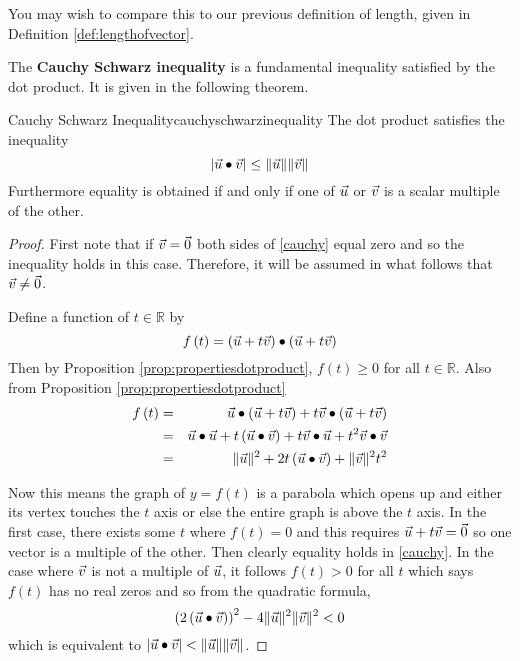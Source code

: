 You may wish to compare this to our previous definition of length, 
given in Definition \ref{def:lengthofvector}. 

The \textbf{Cauchy Schwarz inequality} is a fundamental inequality satisfied by the dot product. 
 It is given in the following theorem.

\begin{theorem}{Cauchy Schwarz Inequality}{cauchyschwarzinequality}
The dot product satisfies the inequality
\begin{equation}
\left\vert \vec{u}\bullet \vec{v}\right\vert \leq \| \vec{u}\| \| \vec{v}\|   \label{cauchy}
\end{equation}
Furthermore equality is obtained if and only if one of $\vec{u}$ or $\vec{v}$ is a scalar multiple of the other.
\end{theorem}

\begin{proof}
First note that if $\vec{v}=\vec{0}$ both sides of \ref{cauchy}
equal zero and so the inequality holds in this case. Therefore, it will be
assumed in what follows that $\vec{v}\neq \vec{0}$.

Define a function of $t\in \mathbb{R}$ by 
\begin{equation*}
f\left( t\right) =\left( \vec{u}+t\vec{v}\right) \bullet \left( \vec{u}+
t\vec{v}\right) 
\end{equation*}
Then by Proposition \ref{prop:propertiesdotproduct}, $f\left( t\right) \geq 0$ for all $t\in \mathbb{R}$.
Also from Proposition \ref{prop:propertiesdotproduct}
\begin{eqnarray*}
f\left( t\right) &=&\vec{u}\bullet \left( \vec{u}+t\vec{v}\right) +
t\vec{v}\bullet \left( \vec{u}+t\vec{v}\right) \\
&=&\vec{u}\bullet \vec{u}+t\left( \vec{u}\bullet \vec{v}\right) + t \vec{v}\bullet \vec{u}+
t^{2}\vec{v}\bullet \vec{v} \\
&=&\| \vec{u}\| ^{2}+2t\left( \vec{u}\bullet \vec{v}\right) +\|
\vec{v}\| ^{2}t^{2}
\end{eqnarray*}

Now this means the graph of $y=f\left( t\right) $ is a parabola which opens
up and either its vertex touches the $t$ axis or else the entire graph is
above the $t$ axis. In the first case, there exists some $t$ where $f\left(
t\right) =0$ and this requires $\vec{u}+t\vec{v}=\vec{0}$ so one vector is a
multiple of the other. Then clearly equality holds in \ref{cauchy}. In the
case where $\vec{v}$ is not a multiple of $\vec{u}$, it follows 
$f\left( t\right) >0$ for all $t$ which says $f\left( t\right) $ has no real
zeros and so from the quadratic formula,
\begin{equation*}
\left( 2\left( \vec{u}\bullet \vec{v}\right) \right) ^{2}-4\| \vec{u}
\| ^{2}\| \vec{v}\| ^{2}<0
\end{equation*}
which is equivalent to $\left\vert \vec{u}\bullet \vec{v} \right\vert
<\| \vec{u}\| \| \vec{v}\| $.
\end{proof}

